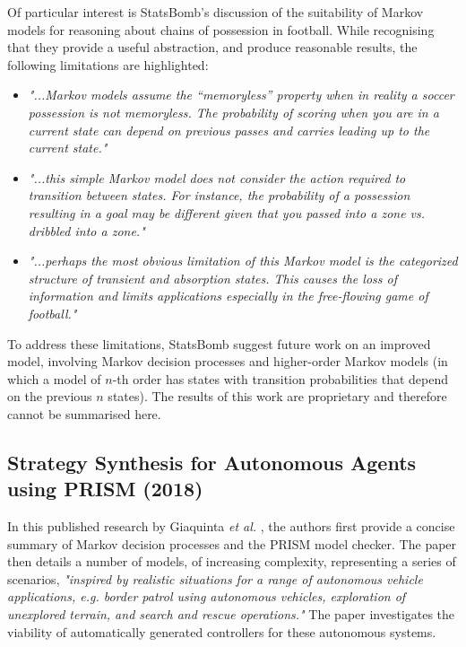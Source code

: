 \documentclass{l4proj}
\begin{document}
Of particular interest is StatsBomb's discussion of the suitability of Markov models for reasoning about chains of possession in football. While recognising that they provide a useful abstraction, and produce reasonable results, the following limitations are highlighted:

\begin{itemize}
    \item \textit{"...Markov models assume the “memoryless” property when in reality a soccer possession is not memoryless. The probability of scoring when you are in a current state can depend on previous passes and carries leading up to the current state."}
    \item \textit{"...this simple Markov model does not consider the action required to transition between states. For instance,  the probability of a possession resulting in a goal may be different given that you passed into a zone vs. dribbled into a zone."}
    \item \textit{"...perhaps the most obvious limitation of this Markov model is the categorized structure of transient and absorption states. This causes the loss of information and limits applications especially in the free-flowing game of football."} \cite{sbomb2}
\end{itemize}

To address these limitations, StatsBomb suggest future work on an improved model, involving Markov decision processes and higher-order Markov models (in which a model of $n$-th order has states with transition probabilities that depend on the previous $n$ states). The results of this work are proprietary and therefore cannot be summarised here.

\subsection{Strategy Synthesis for Autonomous Agents using PRISM (2018)}

In this published research by Giaquinta \textit{et al.} \cite{fac2}, the authors first provide a concise summary of Markov decision processes and the PRISM model checker. The paper then details a number of models, of increasing complexity, representing a series of scenarios, \textit{"inspired by realistic situations for a range of autonomous vehicle applications, e.g. border patrol using autonomous vehicles, exploration of unexplored terrain, and search and rescue operations."} The paper investigates the viability of automatically generated controllers for these autonomous systems.
\end{document}
